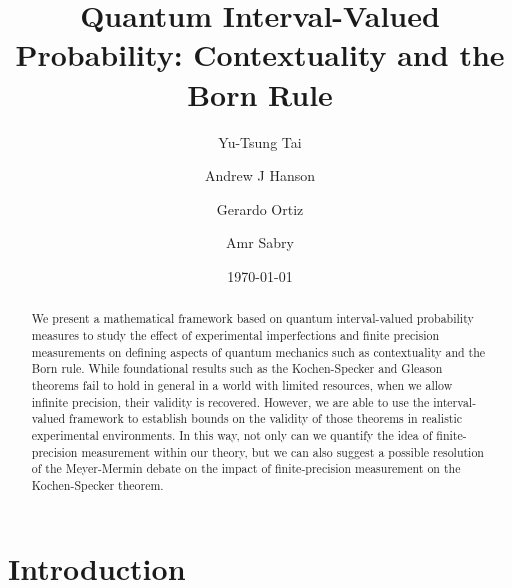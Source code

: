 \documentclass[english,reprint, aps, prl,superscriptaddress, showpacs,
showkeys, longbibliography, amsmath, amssymb, floatfix]{revtex4-1}
\theoremstyle{plain}
\theoremstyle{definition}
\begin{document}
\title{Quantum Interval-Valued Probability: Contextuality and the Born Rule}

\author{Yu-Tsung Tai}

\author{Andrew J Hanson}

\author{Gerardo Ortiz}

\author{Amr Sabry}

\date{\today}

\begin{abstract}
We present a mathematical framework based on quantum interval-valued
probability measures to study the effect of experimental imperfections
and finite precision measurements on defining aspects of quantum
mechanics such as contextuality and the Born rule. While foundational
results such as the Kochen-Specker and Gleason theorems fail to hold
in general in a world with limited resources, when we allow infinite
precision, their validity is recovered.  However, we are able to use
the interval-valued framework to establish bounds on the validity of
those theorems in realistic experimental environments. In this way,
not only can we quantify the idea of finite-precision measurement
within our theory, but we can also suggest a possible resolution of
the Meyer-Mermin debate on the impact of finite-precision measurement
on the Kochen-Specker theorem.
\end{abstract}



\maketitle

\section{Introduction}
\end{document}
